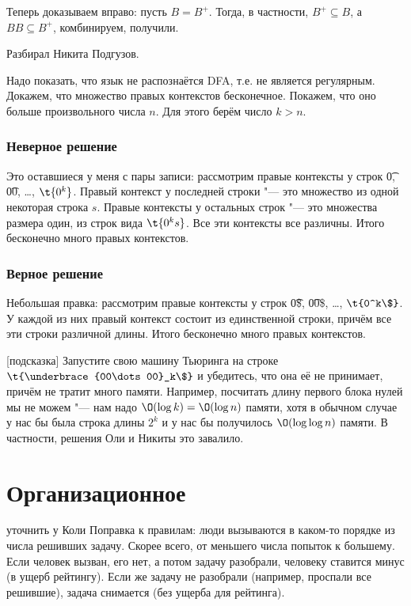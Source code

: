 	Теперь доказываем вправо: пусть $B=B^{+}$.
	Тогда, в частности, $B^{+} \subseteq B$, а $BB \subseteq B^{+}$, комбинируем, получили.

	Разбирал Никита Подгузов.

	Надо показать, что язык не распознаётся DFA, т.е. не является регулярным.
	Докажем, что множество правых контекстов бесконечное.
	Покажем, что оно больше произвольного числа $n$.
	Для этого берём число $k>n$.
	\subsubsection{Неверное решение}
		Это оставшиеся у меня с пары записи:
		рассмотрим правые контексты у строк \t{0}, \t{00}, \dots, $\t{0^k}$.
		Правый контекст у последней строки "--- это множество из одной некоторая строка $s$.
		Правые контексты у остальных строк "--- это множества размера один, из строк вида $\t{0^ks}$.
		Все эти контексты все различны.
		Итого бесконечно много правых контекстов.

	\subsubsection{Верное решение}
		Небольшая правка:
		рассмотрим правые контексты у строк \t{0\$}, \t{00\$}, \dots, $\t{0^k\$}$.
		У каждой из них правый контекст состоит из единственной строки, причём все
		эти строки различной длины.
		Итого бесконечно много правых контекстов.

[подсказка]
	Запустите свою машину Тьюринга на строке $\t{\underbrace{00\dots00}_k\$}$ и убедитесь, что она её не принимает,
	причём не тратит много памяти.
	Например, посчитать длину первого блока нулей мы не можем "--- нам надо $\O(\log k)=\O(\log n)$ памяти,
	хотя в обычном случае у нас бы была строка длины $2^k$ и у нас бы получилось $\O(\log \log n)$ памяти.
	В частности, решения Оли и Никиты это завалило.

\section{Организационное}
	\TODO уточнить у Коли
	Поправка к правилам: люди вызываются в каком-то порядке из числа решивших задачу.
	Скорее всего, от меньшего числа попыток к большему.
	Если человек вызван, его нет, а потом задачу разобрали, человеку ставится минус (в ущерб рейтингу).
	Если же задачу не разобрали (например, проспали все решившие), задача снимается (без ущерба для рейтинга).
